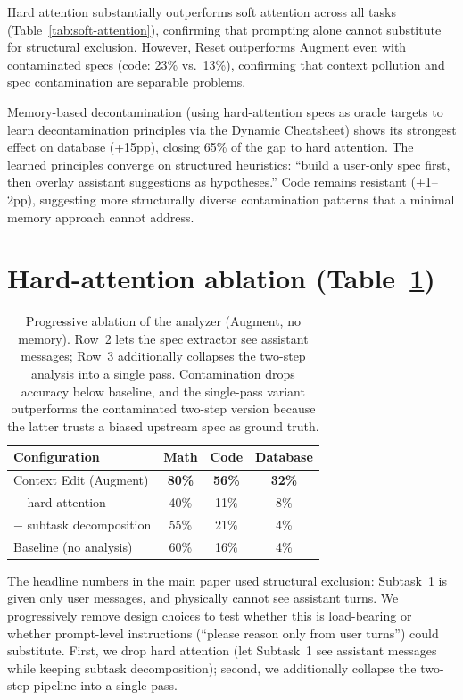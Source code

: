 \documentclass{article}
\begin{document}
Hard attention substantially outperforms soft attention across all tasks (Table~\ref{tab:soft-attention}), confirming that prompting alone cannot substitute for structural exclusion. However, Reset outperforms Augment even with contaminated specs (code: 23\% vs.\ 13\%), confirming that context pollution and spec contamination are separable problems.

Memory-based decontamination (using hard-attention specs as oracle targets to learn decontamination principles via the Dynamic Cheatsheet) shows its strongest effect on database (+15pp), closing 65\% of the gap to hard attention. The learned principles converge on structured heuristics: ``build a user-only spec first, then overlay assistant suggestions as hypotheses.'' Code remains resistant (+1--2pp), suggesting more structurally diverse contamination patterns that a minimal memory approach cannot address.

\section{Hard-attention ablation (Table~\ref{tab:cognitive-hazard})}
\label{app:hard-attention}

\begin{table}[h]
\centering
\begin{tabular}{lccc}
\toprule
\textbf{Configuration} & \textbf{Math} & \textbf{Code} & \textbf{Database} \\
\midrule
Context Edit (Augment) & \textbf{80\%} & \textbf{56\%} & \textbf{32\%} \\
\quad $-$ hard attention & 40\% & 11\% & 8\% \\
\quad\quad $-$ subtask decomposition & 55\% & 21\% & 4\% \\
\midrule
Baseline (no analysis) & 60\% & 16\% & 4\% \\
\bottomrule
\end{tabular}
\caption{Progressive ablation of the analyzer (Augment, no memory). Row~2 lets the spec extractor see assistant messages; Row~3 additionally collapses the two-step analysis into a single pass. Contamination drops accuracy below baseline, and the single-pass variant outperforms the contaminated two-step version because the latter trusts a biased upstream spec as ground truth.}
\label{tab:cognitive-hazard}
\end{table}

The headline numbers in the main paper used structural exclusion: Subtask~1 is given only user messages, and physically cannot see assistant turns. We progressively remove design choices to test whether this is load-bearing or whether prompt-level instructions (``please reason only from user turns'') could substitute. First, we drop hard attention (let Subtask~1 see assistant messages while keeping subtask decomposition); second, we additionally collapse the two-step pipeline into a single pass.
\end{document}
